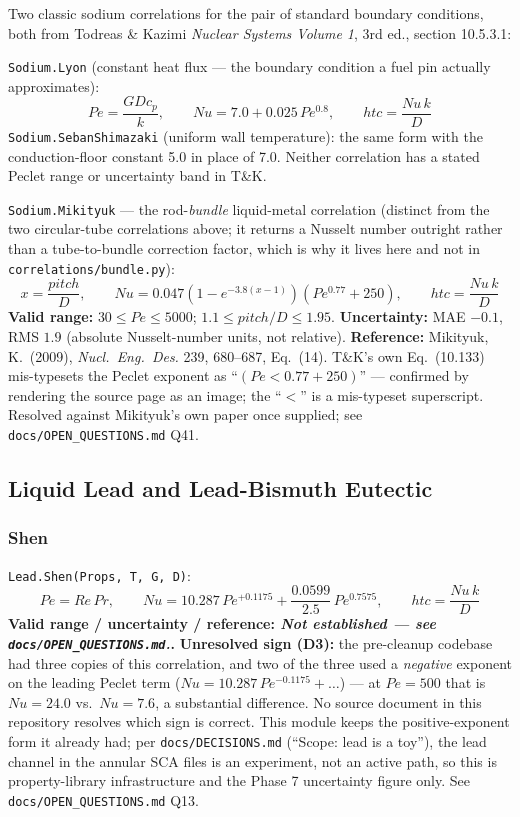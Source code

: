 \documentclass[11pt]{article}
\newcommand{\code}[1]{\texttt{#1}}
\newcommand{\notest}{\textit{Not established --- see \code{docs/OPEN\_QUESTIONS.md}.}}
\begin{document}
Two classic sodium correlations for the pair of standard boundary conditions, both from
Todreas \& Kazimi \emph{Nuclear Systems Volume 1}, 3rd ed., section 10.5.3.1:

\code{Sodium.Lyon} (constant heat flux --- the boundary condition a fuel pin actually
approximates):
\[
  Pe = \frac{GDc_p}{k}, \qquad Nu = 7.0 + 0.025\,Pe^{0.8}, \qquad htc=\frac{Nu\,k}{D}
\]
\code{Sodium.SebanShimazaki} (uniform wall temperature): the same form with the
conduction-floor constant 5.0 in place of 7.0. Neither correlation has a stated Peclet
range or uncertainty band in T\&K.

\code{Sodium.Mikityuk} --- the rod-\emph{bundle} liquid-metal correlation (distinct from
the two circular-tube correlations above; it returns a Nusselt number outright rather
than a tube-to-bundle correction factor, which is why it lives here and not in
\code{correlations/bundle.py}):
\[
  x = \frac{pitch}{D}, \qquad Nu = 0.047\left(1-e^{-3.8(x-1)}\right)\left(Pe^{0.77}+250\right), \qquad htc=\frac{Nu\,k}{D}
\]
\textbf{Valid range:} $30\le Pe\le5000$; $1.1\le pitch/D\le1.95$. \textbf{Uncertainty:}
MAE $-0.1$, RMS $1.9$ (absolute Nusselt-number units, not relative). \textbf{Reference:}
Mikityuk, K.\ (2009), \emph{Nucl.\ Eng.\ Des.} 239, 680--687, Eq.\ (14). T\&K's own
Eq.\ (10.133) mis-typesets the Peclet exponent as ``$(Pe<0.77+250)$'' --- confirmed by
rendering the source page as an image; the ``$<$'' is a mis-typeset superscript. Resolved
against Mikityuk's own paper once supplied; see \code{docs/OPEN\_QUESTIONS.md} Q41.

\subsection{Liquid Lead and Lead-Bismuth Eutectic}

\subsubsection{Shen}

\code{Lead.Shen(Props, T, G, D)}:
\[
  Pe = Re\,Pr, \qquad Nu = 10.287\,Pe^{+0.1175} + \frac{0.0599}{2.5}\,Pe^{0.7575}, \qquad htc=\frac{Nu\,k}{D}
\]
\textbf{Valid range / uncertainty / reference: \notest{}.} \textbf{Unresolved sign
(D3):} the pre-cleanup codebase had three copies of this correlation, and two of the
three used a \emph{negative} exponent on the leading Peclet term
($Nu=10.287\,Pe^{-0.1175}+\ldots$) --- at $Pe=500$ that is $Nu=24.0$ vs.\ $Nu=7.6$, a
substantial difference. No source document in this repository resolves which sign is
correct. This module keeps the positive-exponent form it already had; per
\code{docs/DECISIONS.md} (``Scope: lead is a toy''), the lead channel in the annular SCA
files is an experiment, not an active path, so this is property-library infrastructure
and the Phase 7 uncertainty figure only. See \code{docs/OPEN\_QUESTIONS.md} Q13.
\end{document}
